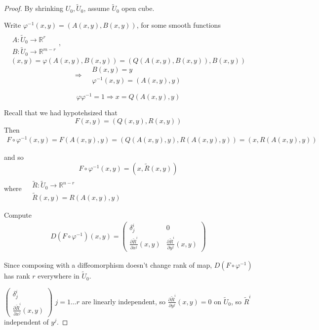 \begin{proof}
	By shrinking $U_0, \widetilde{U}_0$, assume $\widetilde{U}_0$ open cube.
	
	Write $\varphi^{-1}(x,y) = (A(x,y), B(x,y))$, for some smooth functions $\begin{aligned} & \quad \\ 
	& A:\widetilde{U}_0 \to \mathbb{R}^r \\ 
	& B: \widetilde{U}_0 \to \mathbb{R}^{m-r}\end{aligned}$,
	\[
	(x,y) = \varphi(A(x,y) , B(x,y)) = (Q(A(x,y), B(x,y)), B(x,y))
	\]
	\[
	\Longrightarrow \begin{aligned} & B(x,y) = y \\ 
	& \varphi^{-1}(x,y) = (A(x,y), y) \end{aligned}  
	\]
	
	\[
	\varphi \varphi^{-1} = 1 \Longrightarrow x = Q(A(x,y), y)
	\]
	
	Recall that we had hypotehsized that 
	\[
	F(x,y) = (Q(x,y) , R(x,y))
	\]
	Then
	\[
	\begin{gathered}
		F \circ \varphi^{-1}(x,y) = F(A(x,y), y) = (Q(A(x,y), y), R(A(x,y), y)) = (x, R(A(x,y), y))
	\end{gathered}
	\]

	and so 
	\[
	F\circ \varphi^{-1}(x,y) = (x, \widetilde{R}(x,y))
	\]
	where $\begin{aligned} & \quad \\ 
	& \widetilde{R} : \widetilde{U}_0 \to \mathbb{R}^{n-r} \\
	& \widetilde{R}(x,y) = R(A(x,y), y)
	\end{aligned}$

	Compute
	\[
	\begin{gathered}
		D(F\circ \varphi^{-1})(x,y) = \left( \begin{matrix} \delta^i_j & 0 \\
		\frac{ \partial \widetilde{R}^i }{ \partial x^j}(x,y) & \frac{ \partial \widetilde{R}^i }{ \partial y^j}(x,y) \end{matrix} \right) 	
	\end{gathered}
	\]
	
	Since composing with a diffeomorphism doesn't change rank of map, $D(F\circ \varphi^{-1})$ has rank $r$ everywhere in $\widetilde{U}_0$.  

	$\left( \begin{matrix} \delta^i_j \\ \frac{ \partial \widetilde{R}^i }{ \partial x^j}(x,y) \end{matrix} \right)$ $j=1\dots r$ are linearly independent, so $\frac{\partial \widetilde{R}^i}{ \partial y^j}(x,y) = 0$ on $\widetilde{U}_0$, so $\widetilde{R}^i$ independent of $y^j$.
	

\end{proof}

